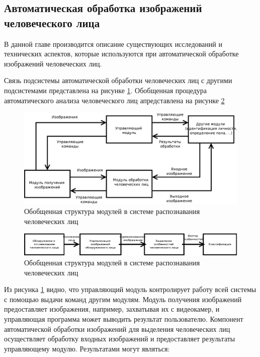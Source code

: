 \subsection{Автоматическая обработка изображений человеческого лица}

В данной главе производится описание существующих исследований и технических аспектов, которые используются при автоматической обработке изображений человеческих лиц.


Связь подсистемы автоматической обработки человеческих лиц с другими подсистемами представлена на рисунке \ref{fig:sstructure}. Обобщенная процедура автоматического анализа человеческого лиц апредставлена на рисунке \ref{fig:face-analyse-structure}

\begin{figure}
  \centering
  \includegraphics[width=\textwidth]{inc/dia/face-analyse-relation}
  \caption{Обобщенная структура модулей в системе распознавания человеческих лиц}
  \label{fig:sstructure}
\end{figure}

\begin{figure}
  \centering
  \includegraphics[width=\textwidth]{inc/dia/face-analyse}
  \caption{Обобщенная структура модулей в системе распознавания человеческих лиц}
  \label{fig:face-analyse-structure}
\end{figure}

Из рисунка \ref{fig:sstructure} видно, что управляющий модуль контролирует работу всей системы с помощью выдачи команд другим модулям.
Модуль получения изображений предоставляет изображения, например,  захватывая их с видеокамер, и управляющая программа может выводить результат пользователю.
Компонент автоматической обработки изображений для выделения человеческих лиц осуществляет обработку входных изображений и предоставляет результаты управляющему модулю.
Результатами могут являться:

